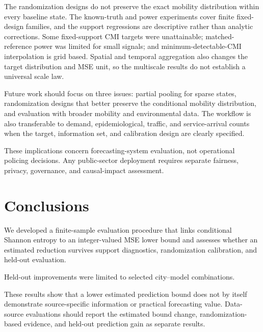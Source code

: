 The randomization designs do not preserve the exact mobility distribution
within every baseline state. The known-truth and power experiments cover
finite fixed-design families, and the support regressions are descriptive
rather than analytic corrections. Some fixed-support CMI targets were
unattainable; matched-reference power was limited for small signals; and
minimum-detectable-CMI interpolation is grid based. Spatial and temporal
aggregation also changes the target distribution and MSE unit, so the
multiscale results do not establish a universal scale law.

Future work should focus on three issues: partial pooling for sparse states,
randomization designs that better preserve the conditional mobility
distribution, and evaluation with broader mobility and environmental data.
The workflow is also transferable to demand, epidemiological, traffic, and
service-arrival counts when the target, information set, and calibration
design are clearly specified.

These implications concern forecasting-system evaluation, not operational
policing decisions. Any public-sector deployment requires separate fairness,
privacy, governance, and causal-impact assessment.


\section{Conclusions}
\label{sec:conclusions}

We developed a finite-sample evaluation procedure that links conditional
Shannon entropy to an integer-valued MSE lower bound and assesses whether an
estimated reduction survives support diagnostics, randomization calibration,
and held-out evaluation.

 Held-out improvements were limited to selected city--model
combinations.

These results show that a lower estimated prediction bound does not by itself
demonstrate source-specific information or practical forecasting value.
Data-source evaluations should report the estimated bound change,
randomization-based evidence, and held-out prediction gain as separate
results.
